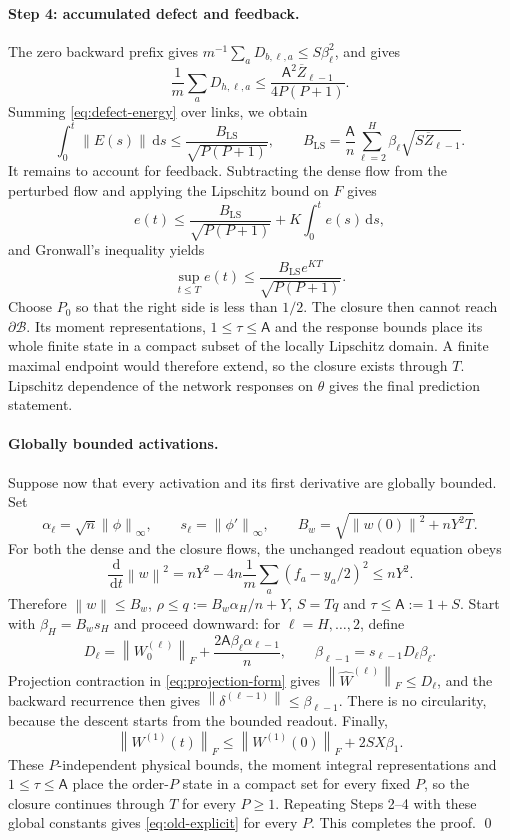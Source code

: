 \documentclass[11pt]{article}
\theoremstyle{definition}
\theoremstyle{remark}
\newcommand{\norm}[1]{\left\lVert #1\right\rVert}
\newcommand{\dd}{\,\mathrm{d}}
\begin{document}
\paragraph{Step 4: accumulated defect and feedback.}
The zero backward prefix gives $m^{-1}\sum_aD_{b,\ell,a}\le S\beta_\ell^2$, and
 gives
\[
 \frac1m\sum_aD_{h,\ell,a}
 \le\frac{\mathsf A^2\overline Z_{\ell-1}}{4P(P+1)}.
\]
Summing \eqref{eq:defect-energy} over links, we obtain
\begin{equation}
 \int_0^t\norm{E(s)}\dd s
 \le\frac{B_{\mathrm{LS}}}{\sqrt{P(P+1)}},\qquad
 B_{\mathrm{LS}}=\frac{\mathsf A}{n}
 \sum_{\ell=2}^H\beta_\ell\sqrt{S\overline Z_{\ell-1}}. \label{eq:old-defect-bound}
\end{equation}
It remains to account for feedback.  Subtracting the dense flow from the
perturbed flow and applying the Lipschitz bound on $F$ gives
\[
 e(t)\le\frac{B_{\mathrm{LS}}}{\sqrt{P(P+1)}}
 +K\int_0^te(s)\dd s,
\]
and Gronwall's inequality yields
\begin{equation}
 \sup_{t\le T}e(t)\le
 \frac{B_{\mathrm{LS}}e^{KT}}{\sqrt{P(P+1)}}.       \label{eq:old-explicit}
\end{equation}
Choose $P_0$ so that the right side is less than $1/2$.  The closure then
cannot reach $\partial\mathcal B$.  Its moment representations,
$1\le\tau\le\mathsf A$ and the response bounds place its whole finite state in a
compact subset of the locally Lipschitz domain.  A finite maximal endpoint would
therefore extend, so the closure exists through $T$.  Lipschitz dependence of
the network responses on $\theta$ gives the final prediction statement.

\paragraph{Globally bounded activations.}
Suppose now that every activation and its first derivative are globally
bounded.  Set
\[
 \alpha_\ell=\sqrt n\norm{\phi}_\infty,\qquad
 s_\ell=\norm{\phi'}_\infty,\qquad
 B_w=\sqrt{\norm{w(0)}^2+nY^2T}.
\]
For both the dense and the closure flows, the unchanged readout equation obeys
\[
 \frac{\dd}{\dd t}\norm w^2
 =nY^2-4n\frac1m\sum_a(f_a-y_a/2)^2\le nY^2.
\]
Therefore $\norm w\le B_w$, $\rho\le q:=B_w\alpha_H/n+Y$, $S=Tq$ and
$\tau\le\mathsf A:=1+S$.  Start with $\beta_H=B_ws_H$ and proceed downward: for
$\ell=H,\ldots,2$, define
\[
 D_\ell=\norm{W_0^{(\ell)}}_F+
 \frac{2\mathsf A\beta_\ell\alpha_{\ell-1}}{n},
 \qquad \beta_{\ell-1}=s_{\ell-1}D_\ell\beta_\ell.
\]
Projection contraction in \eqref{eq:projection-form} gives
$\norm{\widehat W^{(\ell)}}_F\le D_\ell$, and the backward recurrence then gives
$\norm{\delta^{(\ell-1)}}\le\beta_{\ell-1}$.  There is no circularity, because
the descent starts from the bounded readout.  Finally,
\[
 \norm{W^{(1)}(t)}_F\le\norm{W^{(1)}(0)}_F+2SX\beta_1.
\]
These $P$-independent physical bounds, the moment integral representations and
$1\le\tau\le\mathsf A$ place the order-$P$ state in a compact set for every
fixed $P$, so the closure continues through $T$ for every $P\ge1$.  Repeating
Steps 2--4 with these global constants gives \eqref{eq:old-explicit} for every
$P$.  This completes the proof. \qed
\end{document}
